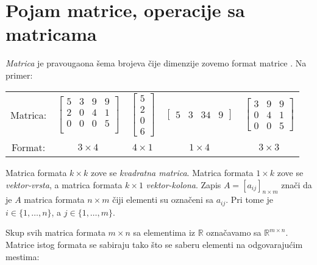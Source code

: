 \documentclass[11pt]{article}
\theoremstyle{masulthm}
\theoremstyle{masuldef}
\theoremstyle{masulexmp}
\theoremstyle{masulproof}
\newcommand{\R}{\mathbb{R}}
\begin{document}
\section{Pojam matrice, operacije sa matricama}

\emph{Matrica} je pravougaona šema brojeva čije dimenzije zovemo
format matrice \cite{klein}. Na primer:

\begin{tabular}{ccccc}
    Matrica: &
    
    $
    \left[\begin{array}{cccc}
    5 & 3 & 9 & 9 \\
    2 & 0 & 4 & 1 \\
    0 & 0 & 0 & 5 \\
    \end{array}\right]
    $ &
    
    $
    \left[\begin{array}{cccc}
    5 \\ 2 \\ 0 \\ 6
    \end{array}\right]
    $ &
    
    $
    \left[\begin{array}{cccc}
    5 & 3 & 34 & 9
    \end{array}\right]
    $ &
    
    $
    \left[\begin{array}{cccc}
    3 & 9 & 9 \\
    0 & 4 & 1 \\
    0 & 0 & 5
    \end{array}\right]
    $ \\

    Format: &
    $ 3 \times 4 $ &
    $ 4 \times 1 $ &
    $ 1 \times 4 $ &
    $ 3 \times 3 $
\end{tabular}

\noindent
Matrica formata $ k \times k $ zove se \emph{kvadratna matrica}.
Matrica formata $ 1 \times k $ zove se \emph{vektor-vrsta},
a matrica formata $ k \times 1 $ \emph{vektor-kolona}. Zapis
$ A = [a_{ij}]_{n \times m} $ znači da je $ A $ matrica formata
$ n \times m $ čiji elementi su označeni sa $ a_{ij} $. Pri
tome je $ i \in \{1, \dots, n\} $, a $ j \in \{1, \dots, m\} $.

Skup svih matrica formata $ m \times n $ sa elementima iz $ \R $
označavamo sa $ \R^{m \times n} $. Matrice istog formata se sabiraju tako što se saberu elementi na odgovarajućim mestima:
\end{document}
